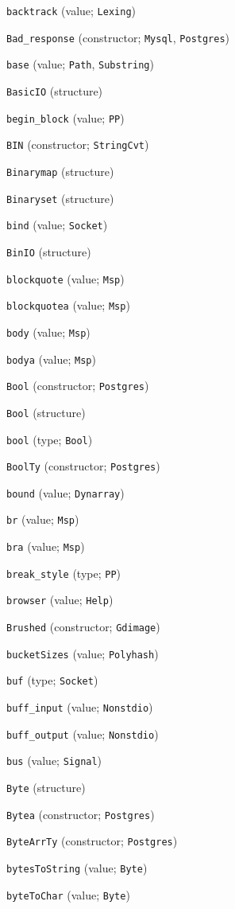 \begin{description}
\item[] \verb"backtrack" (value; \verb"Lexing")
\item[] \verb"Bad_response" (constructor; \verb"Mysql", \verb"Postgres")
\item[] \verb"base" (value; \verb"Path", \verb"Substring")
\item[] \verb"BasicIO" (structure)
\item[] \verb"begin_block" (value; \verb"PP")
\item[] \verb"BIN" (constructor; \verb"StringCvt")
\item[] \verb"Binarymap" (structure)
\item[] \verb"Binaryset" (structure)
\item[] \verb"bind" (value; \verb"Socket")
\item[] \verb"BinIO" (structure)
\item[] \verb"blockquote" (value; \verb"Msp")
\item[] \verb"blockquotea" (value; \verb"Msp")
\item[] \verb"body" (value; \verb"Msp")
\item[] \verb"bodya" (value; \verb"Msp")
\item[] \verb"Bool" (constructor; \verb"Postgres")
\item[] \verb"Bool" (structure)
\item[] \verb"bool" (type; \verb"Bool")
\item[] \verb"BoolTy" (constructor; \verb"Postgres")
\item[] \verb"bound" (value; \verb"Dynarray")
\item[] \verb"br" (value; \verb"Msp")
\item[] \verb"bra" (value; \verb"Msp")
\item[] \verb"break_style" (type; \verb"PP")
\item[] \verb"browser" (value; \verb"Help")
\item[] \verb"Brushed" (constructor; \verb"Gdimage")
\item[] \verb"bucketSizes" (value; \verb"Polyhash")
\item[] \verb"buf" (type; \verb"Socket")
\item[] \verb"buff_input" (value; \verb"Nonstdio")
\item[] \verb"buff_output" (value; \verb"Nonstdio")
\item[] \verb"bus" (value; \verb"Signal")
\item[] \verb"Byte" (structure)
\item[] \verb"Bytea" (constructor; \verb"Postgres")
\item[] \verb"ByteArrTy" (constructor; \verb"Postgres")
\item[] \verb"bytesToString" (value; \verb"Byte")
\item[] \verb"byteToChar" (value; \verb"Byte")
\\[2ex]


\end{description}
